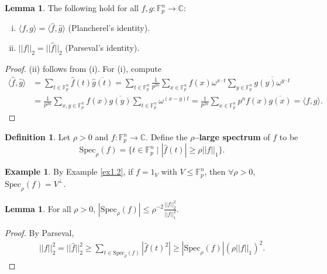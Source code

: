 \documentclass{article}
\theoremstyle{definition}
\newtheorem{lemma}[theorem]{Lemma}
\newtheorem{example}[theorem]{Example}
\newtheorem{defn}[theorem]{Definition}
\begin{document}
\begin{lemma}
    The following hold for all $f, g : \mathbb{F}_{p}^n \to \mathbb{C}$:
    \begin{enumerate}[(i)]
        \item $\langle f,g \rangle = \langle \hat{f}, \hat{g} \rangle$ (Plancherel's identity).
        \item $||f||_2 = ||\hat{f}||_2$ (Parseval's identity).
    \end{enumerate}
\end{lemma}
\begin{proof}
    (ii) follows from (i). For (i), compute
    \begin{align*}
        \langle \hat{f},\hat{g} \rangle &= \sum_{t \in \mathbb{F}_{p}^n}^{} \hat{f}(t)\overline{\hat{g}(t)} = \sum_{t \in \mathbb{F}_{p}^n}^{} \frac{1}{p^{2n}}\sum_{x \in \mathbb{F}_{p}^n}^{} f(x) \omega^{x \cdot t} \sum_{y \in \mathbb{F}_{p}^n}^{} \overline{g(y) \omega^{y\cdot t}}  \\
        &= \frac{1}{p^{2n}}\sum_{x,y \in \mathbb{F}_{p}^n}^{}  f(x)\overline{g(y)}\sum_{t \in \mathbb{F}_{p}^n}^{} \omega^{(x-y)t} = \frac{1}{p^{2n}}\sum_{x \in \mathbb{F}_{p}^n}^{} p^n f(x)\overline{g(x)} = \langle f,g \rangle.
    \end{align*}
    
\end{proof}
\begin{defn}
    Let $\rho > 0$ and $f : \mathbb{F}_{p}^n \to \mathbb{C}$. Define the \textbf{$\rho$--large spectrum} of $f$ to be
    \[
    \text{Spec}_{\rho}(f) = \{t \in \mathbb{F}_{p}^n \mid |\hat{f}(t)| \ge \rho ||f||_1\}.
    \]
\end{defn}
\begin{example}
    By Example \ref{ex1.2}, if $f = 1_V$ with $V \le \mathbb{F}_{p}^n$, then $\forall \rho >0$, $\text{Spec}_{\rho}(f) = V^\perp$.
\end{example}
\begin{lemma}\label{lemma1.8}
    For all $\rho > 0$, $|\text{Spec}_{\rho}(f)| \le \rho^{-2}\frac{||f||_2^2}{||f||_1^2}$.
\end{lemma}
\begin{proof}
    By Parseval,
    \begin{align*}
        ||f||_2^2 = ||\hat{f}||_2^2\ge \sum_{t \in \text{Spec}_{\rho}(f)}^{} |\hat{f}(t)^2| \ge |\text{Spec}_{\rho}(f)|(\rho ||f||_1)^2.
    \end{align*}
\end{proof}
\end{document}
